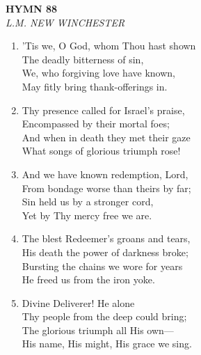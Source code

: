 \newpage
\begin{center}
    {\Large \textbf{HYMN 88}}
    \\
    \textit{L.M. NEW WINCHESTER}
\end{center}
\vspace{1em}

\begin{enumerate}
    \item 'Tis we, O God, whom Thou hast shown \\
        The deadly bitterness of sin, \\
        We, who forgiving love have known, \\
        May fitly bring thank-offerings in.

    \item Thy presence called for Israel's praise, \\
        Encompassed by their mortal foes; \\
        And when in death they met their gaze \\
        What songs of glorious triumph rose!

    \item And we have known redemption, Lord, \\
        From bondage worse than theirs by far; \\
        Sin held us by a stronger cord, \\
        Yet by Thy mercy free we are.

    \item The blest Redeemer's groans and tears, \\
        His death the power of darkness broke; \\
        Bursting the chains we wore for years \\
        He freed us from the iron yoke.

    \item Divine Deliverer! He alone \\
        Thy people from the deep could bring; \\
        The glorious triumph all His own--- \\
        His name, His might, His grace we sing.

\end{enumerate}
